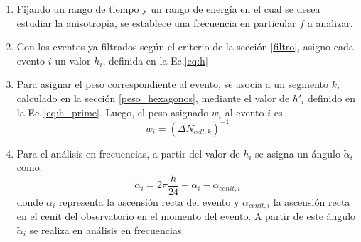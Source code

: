         \begin{enumerate}
        \item Fijando un rango de tiempo y un rango de energía en el cual se desea estudiar la anisotropía, se establece una frecuencia en particular $f$ a analizar.

        \item Con los eventos ya filtrados según el criterio de la sección \ref{filtro}, asigno cada evento $i$ un valor $h_i$, definida en la Ec.\ref{eq:h}

        \item Para asignar el peso correspondiente al evento, se asocia a un segmento $k$, calculado en la sección \ref{peso_hexagonos}, mediante el valor de $h'_i$ definido en la Ec.\,\ref{eq:h_prime}. Luego, el peso asignado $w_i$  al evento $i$ es
        \begin{equation*}
           w_{i}= (\Delta N_{cell,k})^{-1}
        \end{equation*} 
         
        \item Para el análisis en frecuencias, a partir del valor de $h_i$ se asigna un ángulo $\tilde{\alpha}_i$ como:
        \begin{equation}
         \tilde{\alpha}_i = 2\pi \frac{h}{24} + \alpha_i -\alpha_{cenit,i}
        \end{equation}
        donde $\alpha_i$  representa la ascensión recta del evento y $\alpha_{cenit,i}$ la ascensión recta en el cenit del observatorio en el momento del evento. A partir de este ángulo $\tilde{\alpha}_i$ se realiza en análisis en frecuencias.


\end{enumerate}
